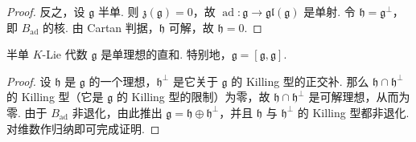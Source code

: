 \begin{numpara}
\begin{proof}
反之，设 $\mathfrak g$ 半单. 则 $\mathfrak z(\mathfrak g)=0$，故 $\operatorname{ad}\colon\mathfrak g\longrightarrow\mathfrak{gl}(\mathfrak g)$ 是单射. 令 $\mathfrak h=\mathfrak g^{\perp}$，即 $B_{\operatorname{ad}}$ 的核. 由 Cartan 判据，$\mathfrak h$ 可解，故 $\mathfrak h=0$.
\end{proof}
\begin{theorem*}
半单 $K$-Lie 代数 $\mathfrak g$ 是单理想的直和. 特别地，$\mathfrak g=[\mathfrak g,\mathfrak g]$.
\end{theorem*}
\begin{proof}
设 $\mathfrak h$ 是 $\mathfrak g$ 的一个理想，$\mathfrak h^{\perp}$ 是它关于 $\mathfrak g$ 的 Killing 型的正交补. 那么 $\mathfrak h\cap\mathfrak h^{\perp}$ 的 Killing 型（它是 $\mathfrak g$ 的 Killing 型的限制）为零，故 $\mathfrak h\cap\mathfrak h^{\perp}$ 是可解理想，从而为零. 由于 $B_{\operatorname{ad}}$ 非退化，由此推出 $\mathfrak g=\mathfrak h\oplus\mathfrak h^{\perp}$，并且 $\mathfrak h$ 与 $\mathfrak h^{\perp}$ 的 Killing 型都非退化. 对维数作归纳即可完成证明.
\end{proof}
\end{numpara}

